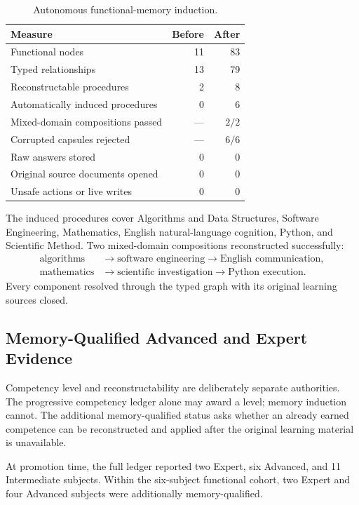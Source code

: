\begin{table}[htbp]
\centering
\caption{Autonomous functional-memory induction.}
\label{tab:functional-memory-induction}
\begin{tabular}{lrr}
\hline
\textbf{Measure} & \textbf{Before} & \textbf{After} \\
\hline
Functional nodes & 11 & 83 \\
Typed relationships & 13 & 79 \\
Reconstructable procedures & 2 & 8 \\
Automatically induced procedures & 0 & 6 \\
Mixed-domain compositions passed & --- & $2/2$ \\
Corrupted capsules rejected & --- & $6/6$ \\
Raw answers stored & 0 & 0 \\
Original source documents opened & 0 & 0 \\
Unsafe actions or live writes & 0 & 0 \\
\hline
\end{tabular}
\end{table}

The induced procedures cover Algorithms and Data Structures, Software
Engineering, Mathematics, English natural-language cognition, Python, and
Scientific Method.  Two mixed-domain compositions reconstructed successfully:
\begin{align}
\text{algorithms}
&\rightarrow \text{software engineering}
\rightarrow \text{English communication}, \\
\text{mathematics}
&\rightarrow \text{scientific investigation}
\rightarrow \text{Python execution}.
\end{align}
Every component resolved through the typed graph with its original learning
sources closed.

\subsection{Memory-Qualified Advanced and Expert Evidence}

Competency level and reconstructability are deliberately separate authorities.
The progressive competency ledger alone may award a level; memory induction
cannot.  The additional memory-qualified status asks whether an already earned
competence can be reconstructed and applied after the original learning
material is unavailable.

At promotion time, the full ledger reported two Expert, six Advanced, and 11
Intermediate subjects.  Within the six-subject functional cohort, two Expert
and four Advanced subjects were additionally memory-qualified.

